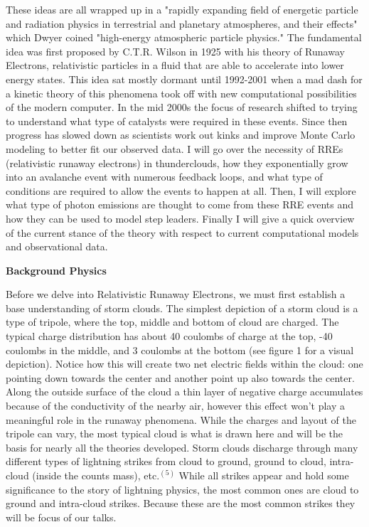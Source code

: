 \documentclass[11pt]{article}
\begin{document}
    These ideas are all wrapped up in a "rapidly expanding field of energetic particle and radiation physics in terrestrial and planetary atmospheres, and their effects" which Dwyer coined "high-energy atmospheric particle physics." The fundamental idea was first proposed by C.T.R. Wilson in 1925 with his theory of Runaway Electrons, relativistic particles in a fluid that are able to accelerate into lower energy states. This idea sat mostly dormant until 1992-2001 when a mad dash for a kinetic theory of this phenomena took off with new computational possibilities of the modern computer. In the mid 2000s the focus of research shifted to trying to understand what type of catalysts were required in these events. Since then progress has slowed down as scientists work out kinks and improve Monte Carlo modeling to better fit our observed data. I will go over the necessity of RREs (relativistic runaway electrons) in thunderclouds, how they exponentially grow into an avalanche event with numerous feedback loops, and what type of conditions are required to allow the events to happen at all. Then, I will explore what type of photon emissions are thought to come from these RRE events and how they can be used to model step leaders. Finally I will give a quick overview of the current stance of the theory with respect to current computational models and observational data. 
    \newline
    

    \noindent
{\bf \LARGE Background Physics}

    Before we delve into Relativistic Runaway Electrons, we must first establish a base understanding of storm clouds. The simplest depiction of a storm cloud is a type of tripole, where the top, middle and bottom of cloud are charged. The typical charge distribution has about 40 coulombs of charge at the top, -40 coulombs in the middle, and 3 coulombs at the bottom (see figure 1 for a visual depiction). Notice how this will create two net electric fields within the cloud: one pointing down towards the center and another point up also towards the center. Along the outside surface of the cloud a thin layer of negative charge accumulates because of the conductivity of the nearby air, however this effect won't play a meaningful role in the runaway phenomena. While the charges and layout of the tripole can vary, the most typical cloud is what is drawn here and will be the basis for nearly all the theories developed. Storm clouds discharge through many different types of lightning strikes from cloud to ground, ground to cloud, intra-cloud (inside the counts mass), etc.$^{(5)}$ While all strikes appear and hold some significance to the story of lightning physics, the most common ones are cloud to ground and intra-cloud strikes. Because these are the most common strikes they will be focus of our talks.
    
\end{document}
